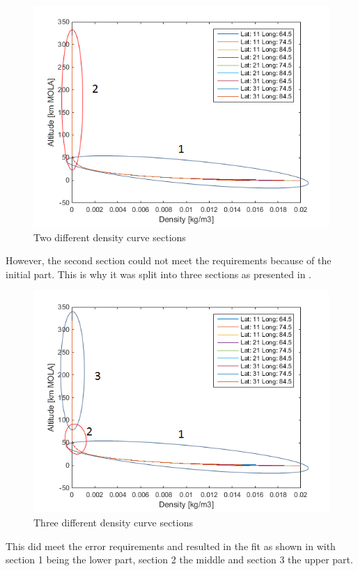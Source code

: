 \begin{figure}[H]
\centering
\includegraphics[width=0.69 \textwidth]{figures/software/densityDataSplit2.png}
\caption{Two different density curve sections}
\label{fig:densityDataSplit2}
\end{figure}

\noindent
However, the second section could not meet the requirements because of the initial part. This is why it was split into three sections as presented in .

\begin{figure}[H]
\centering
\includegraphics[width=0.8 \textwidth]{figures/software/densityDataSplit3.png}
\caption{Three different density curve sections}
\label{fig:densityDataSplit3}
\end{figure}

\noindent
This did meet the error requirements and resulted in the fit as shown in  with section 1 being the lower part, section 2 the middle and section 3 the upper part.

